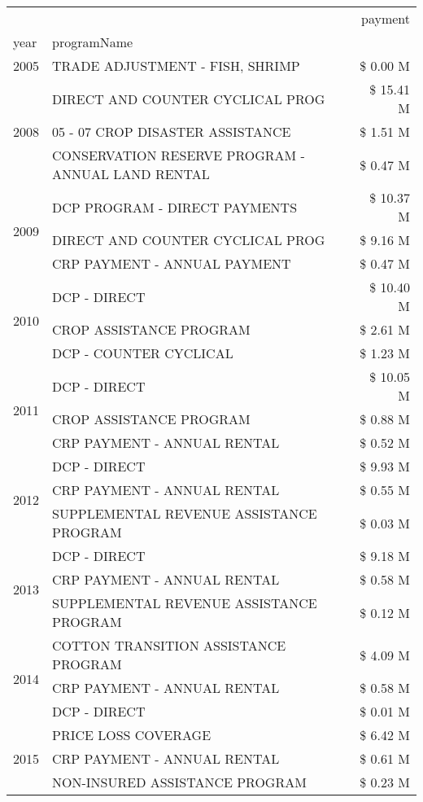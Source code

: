 \begin{tabular}{llr}
\toprule
 &  & payment \\
year & programName &  \\
\midrule
2005 & TRADE ADJUSTMENT - FISH, SHRIMP & \$ 0.00 M \\
\cline{1-3}
\multirow[t]{3}{*}{2008} & DIRECT AND COUNTER CYCLICAL PROG & \$ 15.41 M \\
 & 05 - 07 CROP DISASTER ASSISTANCE & \$ 1.51 M \\
 & CONSERVATION RESERVE PROGRAM - ANNUAL LAND RENTAL & \$ 0.47 M \\
\cline{1-3}
\multirow[t]{3}{*}{2009} & DCP PROGRAM - DIRECT PAYMENTS & \$ 10.37 M \\
 & DIRECT AND COUNTER CYCLICAL PROG & \$ 9.16 M \\
 & CRP PAYMENT - ANNUAL PAYMENT & \$ 0.47 M \\
\cline{1-3}
\multirow[t]{3}{*}{2010} & DCP - DIRECT & \$ 10.40 M \\
 & CROP ASSISTANCE PROGRAM & \$ 2.61 M \\
 & DCP - COUNTER CYCLICAL & \$ 1.23 M \\
\cline{1-3}
\multirow[t]{3}{*}{2011} & DCP - DIRECT & \$ 10.05 M \\
 & CROP ASSISTANCE PROGRAM & \$ 0.88 M \\
 & CRP PAYMENT - ANNUAL RENTAL & \$ 0.52 M \\
\cline{1-3}
\multirow[t]{3}{*}{2012} & DCP - DIRECT & \$ 9.93 M \\
 & CRP PAYMENT - ANNUAL RENTAL & \$ 0.55 M \\
 & SUPPLEMENTAL REVENUE ASSISTANCE PROGRAM & \$ 0.03 M \\
\cline{1-3}
\multirow[t]{3}{*}{2013} & DCP - DIRECT & \$ 9.18 M \\
 & CRP PAYMENT - ANNUAL RENTAL & \$ 0.58 M \\
 & SUPPLEMENTAL REVENUE ASSISTANCE PROGRAM & \$ 0.12 M \\
\cline{1-3}
\multirow[t]{3}{*}{2014} & COTTON TRANSITION ASSISTANCE PROGRAM & \$ 4.09 M \\
 & CRP PAYMENT - ANNUAL RENTAL & \$ 0.58 M \\
 & DCP - DIRECT & \$ 0.01 M \\
\cline{1-3}
\multirow[t]{3}{*}{2015} & PRICE LOSS COVERAGE & \$ 6.42 M \\
 & CRP PAYMENT - ANNUAL RENTAL & \$ 0.61 M \\
 & NON-INSURED ASSISTANCE PROGRAM & \$ 0.23 M \\

\end{tabular}

